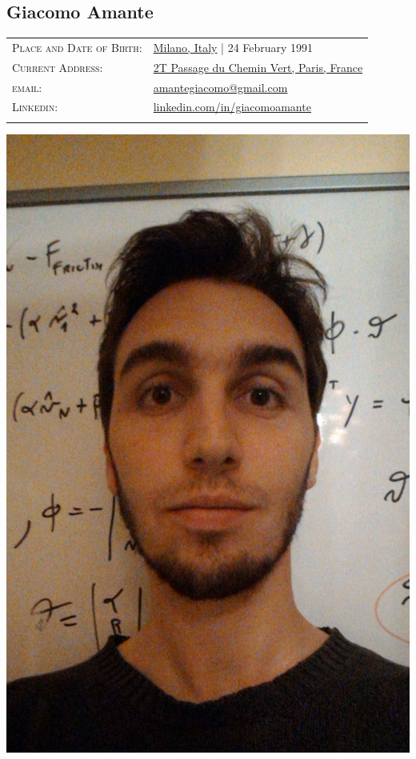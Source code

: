 \documentclass[a4paper,10pt]{article}
\begin{document}
	\pagestyle{empty}

	\begin{minipage}{.65\textwidth}
		\vspace{-5mm}
		\begin{flushleft}
			\section{\Huge Giacomo Amante}	
			\begin{tabular}{ll}
				\textsc{Place and Date of Birth:} & \href{https://www.google.com/maps/place/milano}{Milano, Italy} | 24 February 1991 \\
				\textsc{Current Address:} & \href{https://www.google.it/maps/place/2+Passage+du+Chemin+Vert,+75011+Paris/@48.8597221,2.3725467,17z/data=!3m1!4b1!4m5!3m4!1s0x47e66df96ea289b5:0xdb763fce45ffb863!8m2!3d48.8597221!4d2.3747354}{2T Passage du Chemin Vert, Paris, France}\\
				\textsc{email:} & \href{mailto:amantegiacomo@gmail.com}{amantegiacomo@gmail.com} \\
				\textsc{Linkedin:} & 
				\href{http://www.linkedin.com/in/giacomoamante}{\color{black}linkedin.com/in/giacomoamante}\\
				\multicolumn{2}{c}{} \\
			\end{tabular}				
		\end{flushleft}
	\end{minipage}%
	\hspace{10mm}%
	\begin{minipage}[c]{.25\textwidth}
		\begin{flushright}
			\includegraphics[width=.70\textwidth]{GiacomoAmante_lowres}
		\end{flushright}
	\end{minipage}
\end{document}
